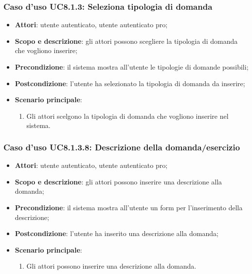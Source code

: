 	\subsubsection{Caso d'uso UC8.1.3: Seleziona tipologia di domanda}
	\begin{itemize}
		\item
			\textbf{Attori}: utente autenticato, utente autenticato pro;
		\item
			\textbf{Scopo e descrizione}: gli attori possono scegliere la tipologia di domanda che vogliono inserire;
		\item		
			\textbf{Precondizione}: il sistema mostra all'utente le tipologie di domande possibili;
		\item
			\textbf{Postcondizione}: l'utente ha selezionato la tipologia di domanda da inserire;
		\item
			\textbf{Scenario principale}:
				\begin{enumerate}
					\item 	
						Gli attori scelgono la tipologia di domanda che vogliono inserire nel sistema.	
				\end{enumerate}
	\end{itemize}









\subsubsection{Caso d'uso UC8.1.3.8: Descrizione della domanda/esercizio}
\begin{itemize}
		\item
			\textbf{Attori}: utente autenticato, utente autenticato pro;
		\item
			\textbf{Scopo e descrizione}: gli attori possono inserire una descrizione alla domanda;
		\item		
			\textbf{Precondizione}: il sistema mostra all'utente un form per l'inserimento della descrizione;
		\item
			\textbf{Postcondizione}: l'utente ha inserito una descrizione alla domanda;
		\item
			\textbf{Scenario principale}:
				\begin{enumerate}
					\item 	
						Gli attori possono inserire una descrizione alla domanda.	
				\end{enumerate}
	\end{itemize}



